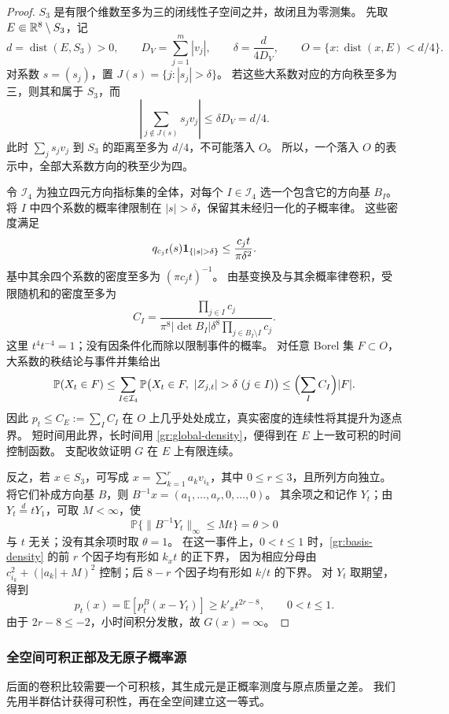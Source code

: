 \begin{proof}
$S_3$ 是有限个维数至多为三的闭线性子空间之并，故闭且为零测集。
先取 $E\Subset\mathbb{R}^8\setminus S_3$，记
\[
 d=\operatorname{dist}(E,S_3)>0,\qquad
 D_V=\sum_{j=1}^m|v_j|,\qquad \delta=\frac d{4D_V},
 \qquad O=\{x:\operatorname{dist}(x,E)<d/4\}.
\]
对系数 $s=(s_j)$，置 $J(s)=\{j:|s_j|>\delta\}$。
若这些大系数对应的方向秩至多为三，则其和属于 $S_3$，而
\[
 \left|\sum_{j\notin J(s)}s_jv_j\right|\le\delta D_V=d/4.
\]
此时 $\sum_js_jv_j$ 到 $S_3$ 的距离至多为 $d/4$，不可能落入 $O$。
所以，一个落入 $O$ 的表示中，全部大系数方向的秩至少为四。

令 $\mathcal I_4$ 为独立四元方向指标集的全体，对每个 $I\in\mathcal I_4$ 选一个包含它的方向基 $B_I$。
将 $I$ 中四个系数的概率律限制在 $|s|>\delta$，保留其未经归一化的子概率律。
这些密度满足
\[
 q_{c_jt}(s)\ind_{\{|s|>\delta\}}\le\frac{c_jt}{\pi\delta^2}.
\]
基中其余四个系数的密度至多为 $(\pi c_jt)^{-1}$。
由基变换及与其余概率律卷积，受限随机和的密度至多为
\[
 C_I=\frac{\prod_{j\in I}c_j}
 {\pi^8|\det B_I|\delta^8\prod_{j\in B_I\setminus I}c_j}.
\]
这里 $t^4t^{-4}=1$；没有因条件化而除以限制事件的概率。
对任意 Borel 集 $F\subset O$，大系数的秩结论与事件并集给出
\[
 \mathbb P(X_t\in F)
 \le\sum_{I\in\mathcal I_4}
 \mathbb P\bigl(X_t\in F,\ |Z_{j,t}|>\delta\ (j\in I)\bigr)
 \le\Bigl(\sum_I C_I\Bigr)|F|.
\]
因此 $p_t\le C_E:=\sum_I C_I$ 在 $O$ 上几乎处处成立，真实密度的连续性将其提升为逐点界。
短时间用此界，长时间用 \eqref{gr:global-density}，便得到在 $E$ 上一致可积的时间控制函数。
支配收敛证明 $G$ 在 $E$ 上有限连续。

反之，若 $x\in S_3$，可写成
$x=\sum_{k=1}^ra_kv_{i_k}$，其中 $0\le r\le3$，且所列方向独立。
将它们补成方向基 $B$，则 $B^{-1}x=(a_1,\ldots,a_r,0,\ldots,0)$。
其余项之和记作 $Y_t$；由 $Y_t\overset d=tY_1$，可取 $M<\infty$，使
\[
 \mathbb P\{\|B^{-1}Y_t\|_\infty\le Mt\}=\theta>0
\]
与 $t$ 无关；没有其余项时取 $\theta=1$。
在这一事件上，$0<t\le1$ 时，\eqref{gr:basis-density} 的前 $r$ 个因子均有形如 $k_xt$ 的正下界，
因为相应分母由 $c_{i_k}^2+(|a_k|+M)^2$ 控制；后 $8-r$ 个因子均有形如 $k/t$ 的下界。
对 $Y_t$ 取期望，得到
\[
 p_t(x)=\mathbb E[p_t^B(x-Y_t)]\ge k'_xt^{2r-8},\qquad 0<t\le1.
\]
由于 $2r-8\le-2$，小时间积分发散，故 $G(x)=\infty$。
\end{proof}

\subsubsection{全空间可积正部及无原子概率源}

后面的卷积比较需要一个可积核，其生成元是正概率测度与原点质量之差。
我们先用半群估计获得可积性，再在全空间建立这一等式。

